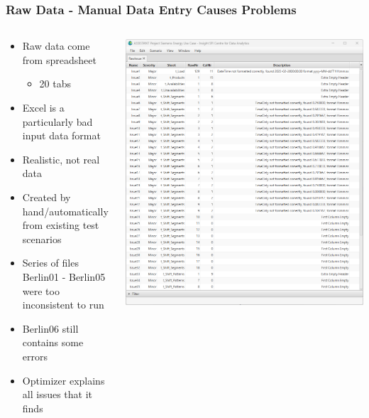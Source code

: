 \begin{frame}
\frametitle{Raw Data - Manual Data Entry Causes Problems}
\begin{columns}
\begin{column}{0.5\textwidth}
\begin{itemize}
\item Raw data come from spreadsheet
\begin{itemize}
\item 20 tabs
\end{itemize}
\item Excel is a particularly bad input data format
\item Realistic, not real data
\item Created by hand/automatically from existing test scenarios
\item Series of files Berlin01 - Berlin05 were too inconsistent to run
\item Berlin06 still contains some errors
\item Optimizer explains all issues that it finds
\end{itemize}
\end{column}
\begin{column}{0.5\textwidth}
\includegraphics[width=.85\textwidth]{imagesse/rawerror}
\end{column}
\end{columns}
\end{frame}

